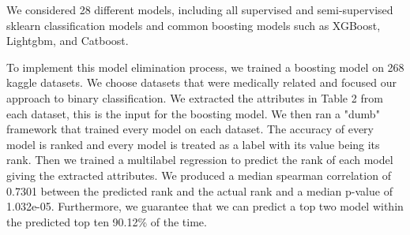 \documentclass{article}
\begin{document}
We considered 28 different models, including all supervised and semi-supervised sklearn classification models and common boosting models such as XGBoost, Lightgbm, and Catboost.

To implement this model elimination process, we trained a boosting model on 268 kaggle datasets. We choose datasets that were medically related and focused our approach to binary classification. We extracted the attributes in Table 2 from each dataset, this is the input for the boosting model. We then ran a "dumb" framework that trained every model on each dataset. The accuracy of every model is ranked and every model is treated as a label with its value being its rank. Then we trained a multilabel regression to predict the rank of each model giving the extracted attributes. We produced a median spearman correlation of 0.7301 between the predicted rank and the actual rank and a median p-value of 1.032e-05. Furthermore, we guarantee that we can predict a top two model within the predicted top ten 90.12\% of the time.
\end{document}
